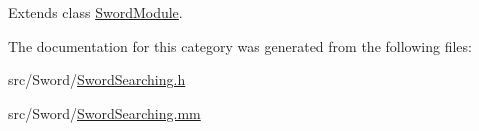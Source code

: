 Extends class \hyperlink{interface_sword_module_ac27de8546781130724ef5aed32a4ec13}{Sword\-Module}.



The documentation for this category was generated from the following files\-:\begin{DoxyCompactItemize}
\item 
src/\-Sword/\hyperlink{_sword_searching_8h}{Sword\-Searching.\-h}\item 
src/\-Sword/\hyperlink{_sword_searching_8mm}{Sword\-Searching.\-mm}\end{DoxyCompactItemize}
